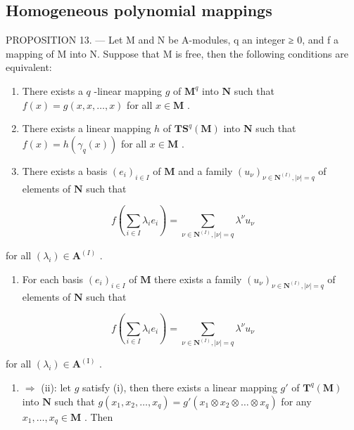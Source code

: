 \subsection{Homogeneous polynomial mappings}

PROPOSITION 13. --- Let M and N be A-modules, q an integer ≥ 0, and f a mapping of M into N. Suppose that M is free, then the following conditions are equivalent:

\begin{enumerate}
\def\labelenumi{(\roman{enumi})}
\item
  There exists a \(q\) -linear mapping \(g\) of \(\mathbf{M}^q\) into \(\mathbf{N}\) such that \(f(x) = g(x, x, \ldots, x)\) for all \(x \in \mathbf{M}\) .
\item
  There exists a linear mapping \(h\) of \(\mathbf{T}\mathbf{S}^q (\mathbf{M})\) into \(\mathbf{N}\) such that \(f(x) = h(\gamma_q(x))\) for all \(x \in \mathbf{M}\) .
\item
  There exists a basis \((e_i)_{i\in I}\) of \(\mathbf{M}\) and a family \((u_{\nu})_{\nu \in \mathbf{N}^{(I)},|\nu| = q}\) of elements of \(\mathbf{N}\) such that
\end{enumerate}

\[
f \left(\sum_ {i \in I} \lambda_ {i} e _ {i}\right) = \sum_ {\nu \in \mathbf {N} ^ {(I)}, | \nu | = q} \lambda^ {\nu} u _ {\nu}\tag{15}
\]

for all \((\lambda_i) \in \mathbf{A}^{(I)}\) .

\begin{enumerate}
\def\labelenumi{(\roman{enumi})}
\setcounter{enumi}{3}
\tightlist
\item
  For each basis \((e_i)_{i\in I}\) of \(\mathbf{M}\) there exists a family \((u_{\nu})_{\nu\in \mathbf{N}^{(I)},|\nu| = q}\) of elements of \(\mathbf{N}\) such that
\end{enumerate}

\[
f \left(\sum_ {i \in I} \lambda_ {i} e _ {i}\right) = \sum_ {\nu \in \mathbf {N} ^ {(I)}, | \nu | = q} \lambda^ {\nu} u _ {\nu}
\]

for all \((\lambda_i) \in \mathbf{A}^{(\mathrm{I})}\) .

\begin{enumerate}
\def\labelenumi{(\roman{enumi})}
\tightlist
\item
  \(\Rightarrow\) (ii): let \(g\) satisfy (i), then there exists a linear mapping \(g'\) of \(\mathbf{T}^q (\mathbf{M})\) into \(\mathbf{N}\) such that \(g(x_{1},x_{2},\ldots ,x_{q}) = g'(x_{1}\otimes x_{2}\otimes \ldots \otimes x_{q})\) for any \(x_{1},\ldots ,x_{q}\in \mathbf{M}\) . Then
\end{enumerate}

